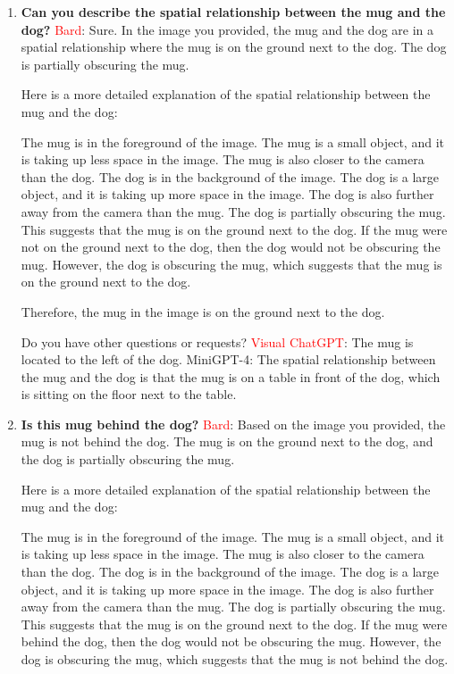 \begin{enumerate}
    \item \textbf{Can you describe the spatial relationship between the mug and the dog?}
    \subitem \textcolor{Red}{Bard}: 
    Sure. In the image you provided, the mug and the dog are in a spatial relationship where the mug is on the ground next to the dog. The dog is partially obscuring the mug.
    
    Here is a more detailed explanation of the spatial relationship between the mug and the dog:
    
    The mug is in the foreground of the image. The mug is a small object, and it is taking up less space in the image. The mug is also closer to the camera than the dog.
    The dog is in the background of the image. The dog is a large object, and it is taking up more space in the image. The dog is also further away from the camera than the mug.
    The dog is partially obscuring the mug. This suggests that the mug is on the ground next to the dog.
    If the mug were not on the ground next to the dog, then the dog would not be obscuring the mug. However, the dog is obscuring the mug, which suggests that the mug is on the ground next to the dog.
    
    Therefore, the mug in the image is on the ground next to the dog.
    
    Do you have other questions or requests?
    \subitem \textcolor{red}{Visual ChatGPT}: The mug is located to the left of the dog.
    \subitem MiniGPT-4: The spatial relationship between the mug and the dog is that the mug is on a table in front of the dog, which is sitting on the floor next to the table.
    \item \textbf{Is this mug behind the dog?}
    \subitem \textcolor{Red}{Bard}: 
    Based on the image you provided, the mug is not behind the dog. The mug is on the ground next to the dog, and the dog is partially obscuring the mug.
    
    Here is a more detailed explanation of the spatial relationship between the mug and the dog:
    
    The mug is in the foreground of the image. The mug is a small object, and it is taking up less space in the image. The mug is also closer to the camera than the dog.
    The dog is in the background of the image. The dog is a large object, and it is taking up more space in the image. The dog is also further away from the camera than the mug.
    The dog is partially obscuring the mug. This suggests that the mug is on the ground next to the dog.
    If the mug were behind the dog, then the dog would not be obscuring the mug. However, the dog is obscuring the mug, which suggests that the mug is not behind the dog.
    

\end{enumerate}
